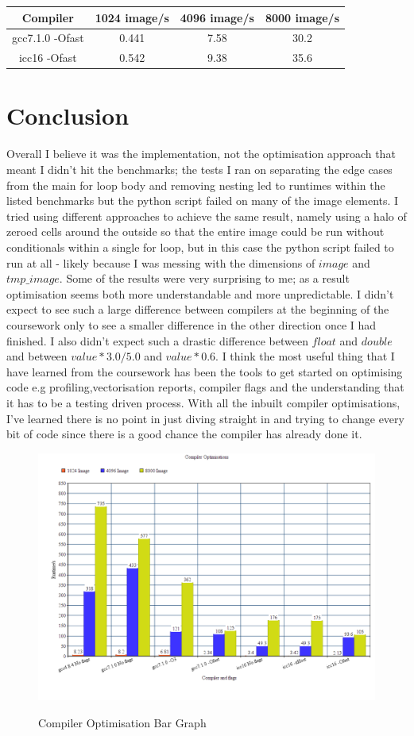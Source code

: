 \documentclass{article}
\begin{document}
    \begin{center}
    \begin{tabular}{| c | c | c | c |}
    Compiler & 1024 image/s & 4096 image/s & 8000 image/s \\ \hline
    gcc7.1.0 -Ofast & 0.441 & 7.58 & 30.2 \\
    icc16 -Ofast & 0.542 & 9.38 & 35.6 
    \end{tabular}
    \end {center}
    
    \section{Conclusion}
    Overall I believe it was the implementation, not the optimisation approach that meant I didn't hit the benchmarks; the tests I ran on separating the edge cases
    from the main for loop body and removing nesting led to runtimes within the listed benchmarks but the python script failed on many of the image elements. I tried
    using different approaches to achieve the same result, namely using a halo of zeroed cells around the outside so that the entire image could be run without 
    conditionals within a single for loop, but in this case the python script failed to run at all - likely because I was messing with the dimensions of $image$ and
    $tmp\_image$.
    Some of the results were very surprising to me; as a result optimisation seems both more understandable and more unpredictable. I didn't expect to see such a large difference between compilers at the beginning of the coursework only to see a smaller difference in the other direction once I had finished. I also didn't expect
    such a drastic difference between $float$ and $double$ and between $value*3.0/5.0$ and $value*0.6$.
    I think the most useful thing that I have learned from the coursework has been the tools to get started on optimising code e.g profiling,vectorisation reports, 
    compiler flags and the understanding that it has to be a testing driven process. With all the inbuilt compiler optimisations, I've learned there is no point in
    just diving straight in and trying to change every bit of code since there is a good chance the compiler has already done it.
    
    \begin{figure}[H]
    \includegraphics[scale=0.5]{graph.png}
    \label{fig:graph}
    \caption{Compiler Optimisation Bar Graph}
    \end{figure}
    
\end{document}
